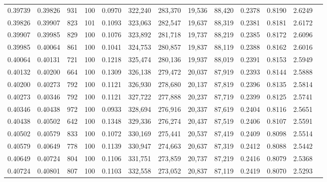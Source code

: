 \begin{tabular}{rrrrrrrrrrrrr}
0.39739 & 0.39826 &   931 & 100 &                                     0.0970 & 322,240 & 283,370 &  19,536 &  88,420 & 0.2378 & 0.8190 & 2.6249 \\
0.39826 & 0.39907 &   823 & 101 &                                     0.1093 & 323,063 & 282,547 &  19,637 &  88,319 & 0.2381 & 0.8181 & 2.6172 \\
0.39907 & 0.39985 &   829 & 100 &                                     0.1076 & 323,892 & 281,718 &  19,737 &  88,219 & 0.2385 & 0.8172 & 2.6096 \\
0.39985 & 0.40064 &   861 & 100 &                                     0.1041 & 324,753 & 280,857 &  19,837 &  88,119 & 0.2388 & 0.8162 & 2.6016 \\
0.40064 & 0.40131 &   721 & 100 &                                     0.1218 & 325,474 & 280,136 &  19,937 &  88,019 & 0.2391 & 0.8153 & 2.5949 \\
0.40132 & 0.40200 &   664 & 100 &                                     0.1309 & 326,138 & 279,472 &  20,037 &  87,919 & 0.2393 & 0.8144 & 2.5888 \\
0.40200 & 0.40273 &   792 & 100 &                                     0.1121 & 326,930 & 278,680 &  20,137 &  87,819 & 0.2396 & 0.8135 & 2.5814 \\
0.40273 & 0.40346 &   792 & 100 &                                     0.1121 & 327,722 & 277,888 &  20,237 &  87,719 & 0.2399 & 0.8125 & 2.5741 \\
0.40346 & 0.40438 &   972 & 100 &                                     0.0933 & 328,694 & 276,916 &  20,337 &  87,619 & 0.2404 & 0.8116 & 2.5651 \\
0.40438 & 0.40502 &   642 & 100 &                                     0.1348 & 329,336 & 276,274 &  20,437 &  87,519 & 0.2406 & 0.8107 & 2.5591 \\
0.40502 & 0.40579 &   833 & 100 &                                     0.1072 & 330,169 & 275,441 &  20,537 &  87,419 & 0.2409 & 0.8098 & 2.5514 \\
0.40579 & 0.40649 &   778 & 100 &                                     0.1139 & 330,947 & 274,663 &  20,637 &  87,319 & 0.2412 & 0.8088 & 2.5442 \\
0.40649 & 0.40724 &   804 & 100 &                                     0.1106 & 331,751 & 273,859 &  20,737 &  87,219 & 0.2416 & 0.8079 & 2.5368 \\
0.40724 & 0.40801 &   807 & 100 &                                     0.1103 & 332,558 & 273,052 &  20,837 &  87,119 & 0.2419 & 0.8070 & 2.5293 \\

\end{tabular}
